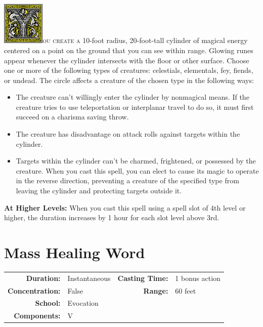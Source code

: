 \documentclass[12pt,showtrims]{memoir}
\begin{document}
\vspace{1\baselineskip}\noindent
\lettrine[lines=4]{\includegraphics[height=58pt]{initials/Y.png}}{ou create a} 10-foot radius, 20-foot-tall cylinder of magical energy centered on a point on the ground that you can see within range. Glowing runes appear whenever the cylinder intersects with the floor or other surface. Choose one or more of the following types of creatures: celestials, elementals, fey, fiends, or undead. The circle affects a creature of the chosen type in the following ways:
\begin{itemize}
    \item The creature can't willingly enter the cylinder by nonmagical means. If the creature tries to use teleportation or interplanar travel to do so, it must first succeed on a charisma saving throw.
    \item The creature has disadvantage on attack rolls against targets within the cylinder.
    \item Targets within the cylinder can't be charmed, frightened, or possessed by the creature. When you cast this spell, you can elect to cause its magic to operate in the reverse direction, preventing a creature of the specified type from leaving the cylinder and protecting targets outside it.
\end{itemize}


\vspace{8pt} \noindent\textbf{At Higher Levels:} When you cast this spell using a spell slot of 4th level or higher, the duration increases by 1 hour for each slot level above 3rd.
\newpage
\section*{Mass Healing Word}

{
\small\centering\vspace{-6pt}
\begin{tabular}{rlrl}
\toprule

\textbf{Duration:} & Instantaneous &
\textbf{Casting Time:} & 1 bonus action \\
\textbf{Concentration:} & False &
\textbf{Range:} & 60 feet \\
\textbf{School:} & Evocation \\
\textbf{Components:} & \multicolumn{3}{p{0.7\textwidth}}{V}\\

\bottomrule
\end{tabular}
}
\end{document}
